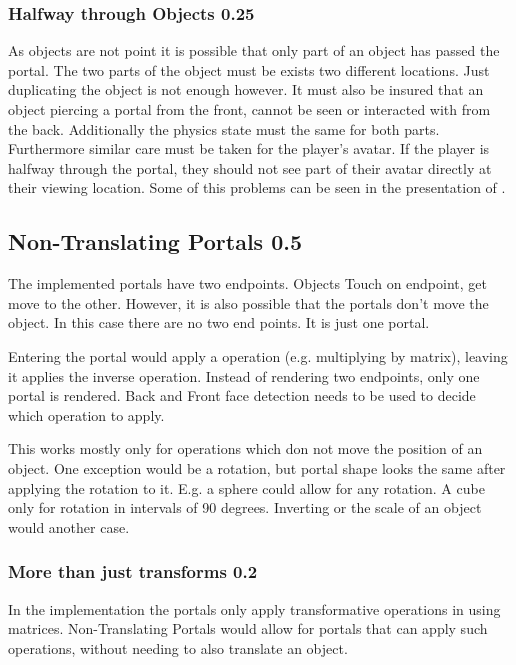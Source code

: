 \subsubsection{Halfway through Objects 0.25}
As objects are not point it is possible that only part of an object has passed the portal. The two parts of the object must be exists two different locations. Just duplicating the object is not enough however. It must also be insured that an object piercing a portal from the front, cannot be seen or interacted with from the back. Additionally the physics state must the same for both parts. Furthermore similar care must be taken for the player's avatar. If the player is halfway through the portal, they should not see part of their avatar directly at their viewing location. Some of this problems can be seen in the presentation of \textcite{lecture:portalProblems}.


\subsection{Non-Translating Portals 0.5}
The implemented portals have two endpoints. Objects Touch on endpoint, get move to the other. However, it is also possible that the portals don't move the object. In this case there are no two end points. It is just one portal.

Entering the portal would apply a operation (e.g. multiplying by matrix), leaving it applies the inverse operation. Instead of rendering two endpoints, only one portal is rendered. Back and Front face detection needs to be used to decide which operation to apply.

This works mostly only for operations which don not move the position of an object. One exception would be a rotation, but portal shape looks the same after applying the rotation to it. E.g. a sphere could allow for any rotation. A cube only for rotation in intervals of 90 degrees. Inverting or the scale of an object would another case.



\subsubsection{More than just transforms 0.2}

In the implementation the portals only apply transformative operations in using matrices. Non-Translating Portals would allow for portals that can apply such operations, without needing to also translate an object.

